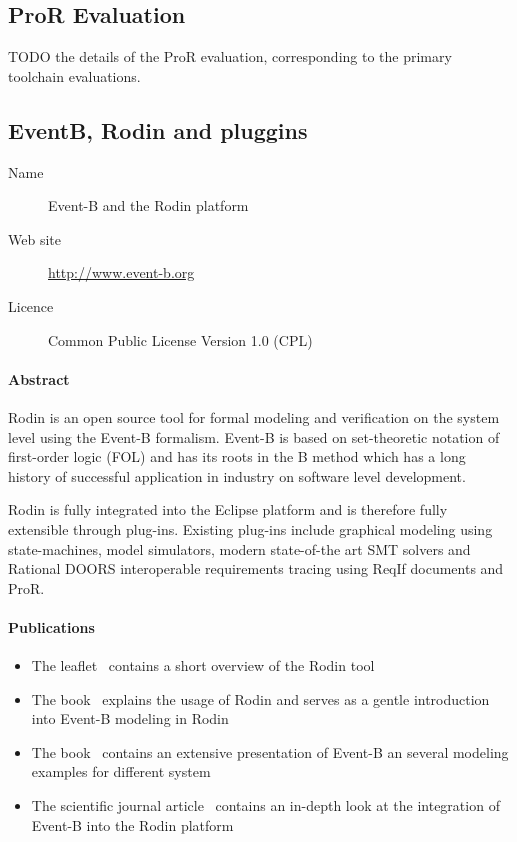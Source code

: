 \subsection{ProR Evaluation}

TODO the details of the ProR evaluation, corresponding to the primary toolchain evaluations.


\subsection{EventB, Rodin and pluggins}

\begin{description}
\item[Name] Event-B and the Rodin platform
\item[Web site] \url{http://www.event-b.org}
\item[Licence] Common Public License Version 1.0 (CPL)
\end{description}

\paragraph{Abstract}

Rodin is an open source tool for formal modeling and verification on the system
level using the Event-B formalism. Event-B is based on set-theoretic notation of
first-order logic (FOL) and has its roots in the B method which has a long
history of successful application in industry on software level development.

Rodin is fully integrated into the Eclipse platform and is therefore fully
extensible through plug-ins. Existing plug-ins include graphical modeling using
state-machines, model simulators, modern state-of-the art SMT solvers and
Rational DOORS interoperable requirements tracing using ReqIf documents and
ProR.

\paragraph{Publications}

\begin{itemize}
\item The leaflet~\cite{RodinLeaflet} contains a short overview of the Rodin
  tool
\item The book~\cite{RodinHandbook} explains the usage of Rodin and serves as a
  gentle introduction into Event-B modeling in Rodin
\item The book~\cite{Abrial:2010:MES:1855020} contains an extensive presentation
  of Event-B an several modeling examples for different system
\item The scientific journal article~\cite{AbrialBHHMV10} contains an in-depth
  look at the integration of Event-B into the Rodin platform
\end{itemize}




